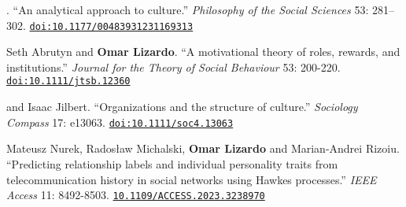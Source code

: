 
. ``An analytical approach to culture.'' {\em Philosophy of the Social Sciences} 53: 281–302. \href{https://doi.org/10.1177/00483931231169313}{\nolinkurl{doi:10.1177/00483931231169313}}

\ind Seth Abrutyn and {\bf Omar Lizardo}. ``A motivational theory of roles, rewards, and institutions.'' {\em Journal for the Theory of Social Behaviour} 53: 200-220. \href{https://doi.org/10.1111/jtsb.12360}{\nolinkurl{doi:10.1111/jtsb.12360}}

 and Isaac Jilbert. ``Organizations and the structure of culture.'' {\em Sociology Compass} 17: e13063. \href{https://doi.org/10.1111/soc4.13063}{\nolinkurl{doi:10.1111/soc4.13063}}

\ind Mateusz Nurek, Rados\l{}aw Michalski, {\bf Omar Lizardo} and Marian-Andrei Rizoiu. ``Predicting relationship labels and individual personality traits from telecommunication history in social networks using Hawkes processes.'' {\em IEEE Access} 11: 8492-8503. \href{https://doi.org/10.1109/ACCESS.2023.3238970}{\nolinkurl{10.1109/ACCESS.2023.3238970}}
